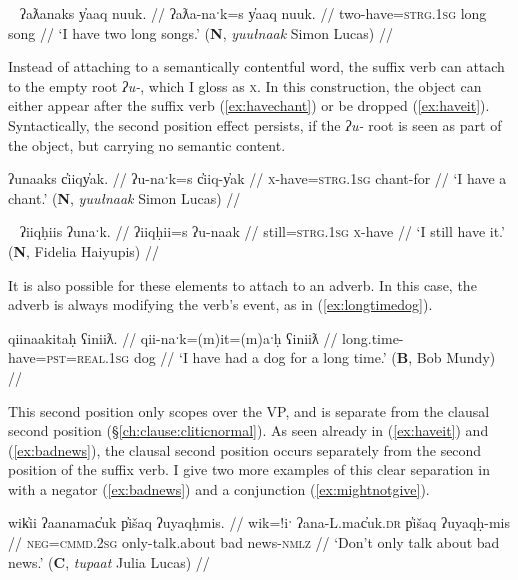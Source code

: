 \ex~ \label{ex:havetwolongsongs}
\begingl
\glpreamble ʔaƛanaks y̓aaq nuuk. //
\gla ʔaƛa-naˑk=s y̓aaq nuuk. //
\glb two-have=\textsc{strg.1sg} long song //
\glft `I have two long songs.' (\textbf{N}, \textit{yuułnaak} Simon Lucas) //
\endgl
\xe

Instead of attaching to a semantically contentful word, the suffix verb can attach to the empty root \textit{ʔu-}, which I gloss as \textsc{x}. In this construction, the object can either appear after the suffix verb (\ref{ex:havechant}) or be dropped (\ref{ex:haveit}). Syntactically, the second position effect persists, if the \textit{ʔu-} root is seen as part of the object, but carrying no semantic content.

\ex \label{ex:havechant}
\begingl
\glpreamble ʔunaaks c̓iiqy̓ak. //
\gla ʔu-naˑk=s c̓iiq-y̓ak //
\glb \textsc{x}-have=\textsc{strg.1sg} chant-for //
\glft `I have a chant.' (\textbf{N}, \textit{yuułnaak} Simon Lucas) //
\endgl
\xe

\ex~ \label{ex:haveit}
\begingl
\glpreamble ʔiiqḥiis ʔunaˑk. //
\gla ʔiiqḥii=s ʔu-naak //
\glb still=\textsc{strg.1sg} \textsc{x}-have //
\glft `I still have it.' (\textbf{N}, Fidelia Haiyupis) //
\endgl
\xe

It is also possible for these elements to attach to an adverb. In this case, the adverb is always modifying the verb's event, as in (\ref{ex:longtimedog}).

\ex \label{ex:longtimedog}
\begingl
\glpreamble qiinaakitaḥ ʕiniiƛ. //
\gla qii-naˑk=(m)it=(m)aˑḥ ʕiniiƛ //
\glb long.time-have=\textsc{pst}=\textsc{real.1sg} dog //
\glft `I have had a dog for a long time.' (\textbf{B}, Bob Mundy) //
\endgl
\xe

This second position only scopes over the VP, and is separate from the clausal second position (\S\ref{ch:clause:cliticnormal}). As seen already in (\ref{ex:haveit}) and (\ref{ex:badnews}), the clausal second position occurs separately from the second position of the suffix verb. I give two more examples of this clear separation in with a negator (\ref{ex:badnews}) and a conjunction (\ref{ex:mightnotgive}).


\ex \label{ex:badnews}
\begingl
\glpreamble wik̓ii ʔaanamac̓uk p̓išaq ʔuyaqḥmis. //
\gla wik=!iˑ ʔana-L.mac̓uk.\textsc{dr} p̓išaq ʔuyaqḥ-mis //
\glb \textsc{neg}=\textsc{cmmd.2sg} only-talk.about bad news-\textsc{nmlz} //
\glft `Don't only talk about bad news.' (\textbf{C}, \textit{tupaat} Julia Lucas) //
\endgl
\xe

